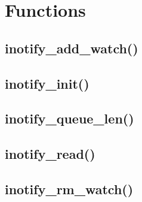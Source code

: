 \section{Functions}



\subsection{inotify\_add\_watch()}




\subsection{inotify\_init()}




\subsection{inotify\_queue\_len()}




\subsection{inotify\_read()}




\subsection{inotify\_rm\_watch()}























































































